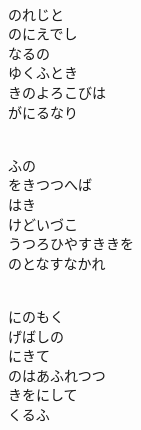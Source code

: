 \documentclass[10pt,b5j]{tarticle} %
\begin{document}
\vspace{1.5em} %
\newcommand{\linespace}{0.5em} %
\newcommand{\blocksize}{0.5\hsize} %
\newcommand{\itemmargin}{3em} %
\begin{enumerate} %
    \setlength{\itemindent}{\itemmargin} %
    \begin{minipage}[c]{\blocksize}
    
        \vspace{\linespace}
        \item~\\
        のれじと\\
        のにえでし\\
        なるの\\
        ゆくふとき\\
        きのよろこびは\\
        がにるなり
        
    \end{minipage}
    \begin{minipage}[c]{\blocksize}
        
        \vspace{\linespace}
        \item~\\
        ふの\\
        をきつつへば\\
        はき\\
        けどいづこ\\
        うつろひやすききを\\
        のとなすなかれ
        
    \end{minipage}
    \begin{minipage}[c]{\blocksize}
        
        \vspace{\linespace}
        \item~\\
        にのもく\\
        げばしの\\
        にきて\\
        のはあふれつつ\\
        きをにして\\
        くるふ
        

\end{minipage}
\end{enumerate}
\end{document}
